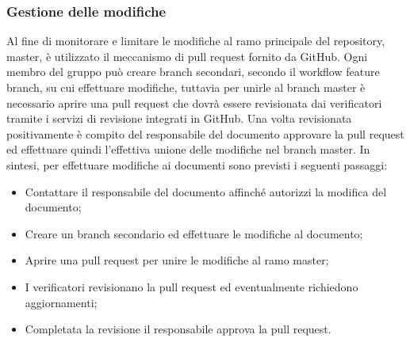 	\subsubsection{Gestione delle modifiche}
		Al fine di monitorare e limitare le modifiche al ramo principale del repository\glo, master, è utilizzato il meccanismo di pull request fornito da GitHub. Ogni membro del gruppo può creare branch secondari, secondo il workflow feature branch, su cui effettuare modifiche, tuttavia per unirle al branch master è necessario aprire una pull request che dovrà essere revisionata dai verificatori tramite i servizi di revisione integrati in GitHub. Una volta revisionata positivamente è compito del responsabile del documento approvare la pull request ed effettuare quindi l'effettiva unione delle modifiche nel branch master.
		\newline
		In sintesi, per effettuare modifiche ai documenti sono previsti i seguenti passaggi:
		\begin{itemize}
			\item Contattare il responsabile del documento affinché autorizzi la modifica del documento;
			\item Creare un branch secondario ed effettuare le modifiche al documento;
			\item Aprire una pull request per unire le modifiche al ramo master;
			\item I verificatori revisionano la pull request ed eventualmente richiedono aggiornamenti;
			\item Completata la revisione il responsabile approva la pull request.
		\end{itemize}
		
